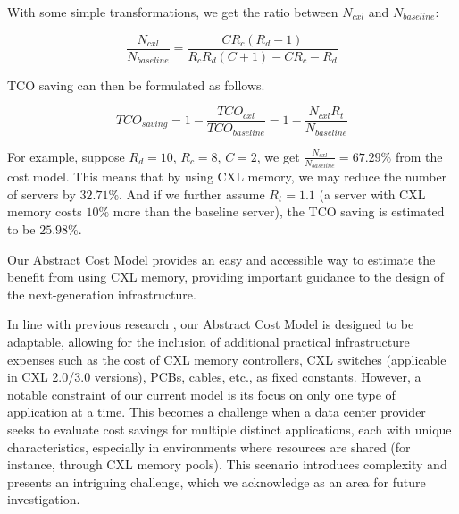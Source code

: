 

With some simple transformations, we get the ratio between $N_{cxl}$ and $N_{baseline}$: 

$$ \frac{N_{cxl}}{N_{baseline}} = \frac{CR_c(R_d - 1)}{R_cR_d(C+1) - C R_c - R_d} $$

TCO saving can then be formulated as follows.

$$
TCO_{saving}=1-\frac{TCO_{cxl}}{TCO_{baseline}}=1-\frac{N_{cxl} R_t}{N_{baseline}}
$$


For example, suppose $ R_d = 10 $, $R_c = 8 $, $ C = 2 $, we get $\frac{N_{cxl}}{N_{baseline}} = 67.29\%$ from the cost model.
This means that by using CXL memory, we may reduce the number of servers by $32.71\%$.
And if we further assume $R_t=1.1$ (a server with CXL memory costs $10\%$ more than the baseline server), the TCO saving is estimated to be $25.98\%$.

Our Abstract Cost Model provides an easy and accessible way to estimate the benefit from using CXL memory,
providing important guidance to the design of the next-generation infrastructure.

In line with previous research \cite{CXLPoolCost}, our Abstract Cost Model is designed to be adaptable, allowing for the inclusion of additional practical infrastructure expenses such as the cost of CXL memory controllers, CXL switches (applicable in CXL 2.0/3.0 versions), PCBs, cables, etc., as fixed constants. However, a notable constraint of our current model is its focus on only one type of application at a time. This becomes a challenge when a data center provider seeks to evaluate cost savings for multiple distinct applications, each with unique characteristics, especially in environments where resources are shared (for instance, through CXL memory pools). This scenario introduces complexity and presents an intriguing challenge, which we acknowledge as an area for future investigation.

